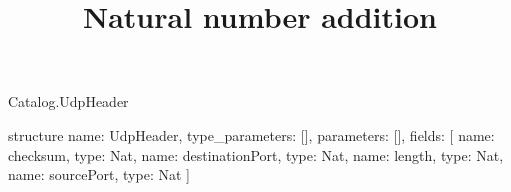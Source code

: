 \begin{lexlean}{Catalog.UdpHeader}
\title{Natural number addition}
\begin{semanticmodule}
structure{
  name: UdpHeader,
  type_parameters: [],
  parameters: [],
  fields: [
    {name: checksum, type: Nat},
    {name: destinationPort, type: Nat},
    {name: length, type: Nat},
    {name: sourcePort, type: Nat}
  ]
}
\end{semanticmodule}
\end{lexlean}
